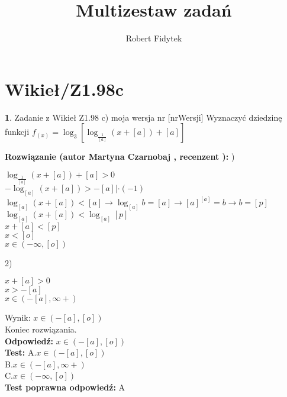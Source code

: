 \documentclass[12pt, a4paper]{article}
\title{Multizestaw zadań}
\author{Robert Fidytek}
\date{}
\theoremstyle{definition} %
\newtheorem{zad}{}
\newcommand{\kategoria}[1]{\section{#1}} %
\newcommand{\zadStart}[1]{\begin{zad}#1\newline} %
\newcommand{\zadStop}{\end{zad}}   %
\newcommand{\rozwStart}[2]{\noindent \textbf{Rozwiązanie (autor #1 , recenzent #2): }\newline} %
\newcommand{\rozwStop}{\newline}                                            %
\newcommand{\odpStart}{\noindent \textbf{Odpowiedź:}\newline}    %
\newcommand{\odpStop}{\newline}                                             %
\newcommand{\testStart}{\noindent \textbf{Test:}\newline} %
\newcommand{\testStop}{\newline} %
\newcommand{\kluczStart}{\noindent \textbf{Test poprawna odpowiedź:}\newline} %
\newcommand{\kluczStop}{\newline} %
\begin{document}
\maketitle


\kategoria{Wikieł/Z1.98c}
\zadStart{Zadanie z Wikieł Z1.98 c) moja wersja nr [nrWersji]}
Wyznaczyć dziedzinę funkcji $ f_{(x)} = \log_{3}[\log_{\frac{1}{[a]}} (x + [a]) +[a]] $\\
\zadStop
\rozwStart{Martyna Czarnobaj}{}
1)
\begin{center}
	$\log_{\frac{1}{[a]}} (x + [a]) +[a] > 0$\\
	$- \log_{[a]} (x + [a]) > - [a] | \cdot (-1)$\\
	$ \log_{[a]} (x + [a]) < [a] \rightarrow \log_{[a]} b = [a] \rightarrow [a]^{[a]} = b \rightarrow b = [p]  $\\
	$ \log_{[a]} (x + [a]) < \log_{[a]} [p] $\\
	$ x + [a] < [p]$\\
	$ x < [o] $\\
	$ x \in (- \infty,[o]) $\\
\end{center}
2)
\begin{center}
	$ x + [a] > 0 $\\
	$ x > -[a] $\\
	$ x \in (-[a],\infty+) $\\
	
\end{center}
Wynik: $ x \in (-[a],[o]) $\\
Koniec rozwiązania.\\
\rozwStop
\odpStart
$ x \in (-[a],[o]) $ \\
\odpStop
\testStart
A.$ x \in (-[a],[o]) $ \\
B.$ x \in (-[a],\infty+) $ \\
C.$ x \in (- \infty,[o]) $ \\
\testStop
\kluczStart
A
\kluczStop
\end{document}
